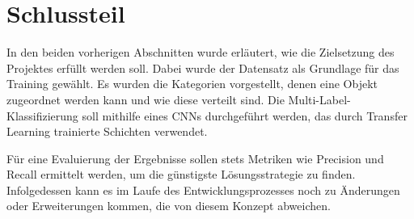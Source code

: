 \section{Schlussteil} \label{sec:conclusion}

In den beiden vorherigen Abschnitten wurde erläutert, wie die Zielsetzung des Projektes erfüllt werden soll. Dabei wurde der  Datensatz als Grundlage für das Training gewählt. Es wurden die Kategorien vorgestellt, denen eine Objekt zugeordnet werden kann und wie diese verteilt sind. Die Multi-Label-Klassifizierung soll mithilfe eines CNNs durchgeführt werden, das durch Transfer Learning trainierte Schichten verwendet. 

Für eine Evaluierung der Ergebnisse sollen stets Metriken wie Precision und Recall ermittelt werden, um die günstigste Lösungsstrategie zu finden. Infolgedessen kann es im Laufe des Entwicklungsprozesses noch zu Änderungen oder Erweiterungen kommen, die von diesem Konzept abweichen.